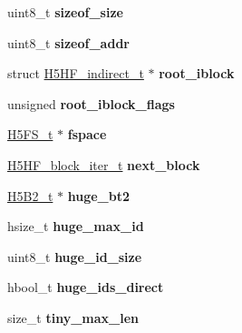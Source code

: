 \begin{DoxyCompactItemize}
uint8\+\_\+t {\bfseries sizeof\+\_\+size}
\item 
\mbox{\label{struct_h5_h_f__hdr__t_a38fe8a107635f6bfbc5d14d339e4a47e}} 
uint8\+\_\+t {\bfseries sizeof\+\_\+addr}
\item 
\mbox{\label{struct_h5_h_f__hdr__t_a09759190ca04fe45961f681103ce82b6}} 
struct \hyperlink{struct_h5_h_f__indirect__t}{H5\+H\+F\+\_\+indirect\+\_\+t} $\ast$ {\bfseries root\+\_\+iblock}
\item 
\mbox{\label{struct_h5_h_f__hdr__t_a3e6bc4aef3da26f6823f104deafa921f}} 
unsigned {\bfseries root\+\_\+iblock\+\_\+flags}
\item 
\mbox{\label{struct_h5_h_f__hdr__t_a1e94a27946dfd6fc386fc44df4c1bcc1}} 
\hyperlink{struct_h5_f_s__t}{H5\+F\+S\+\_\+t} $\ast$ {\bfseries fspace}
\item 
\mbox{\label{struct_h5_h_f__hdr__t_ab66fdd4572188541f4c58ed7dd97bb92}} 
\hyperlink{struct_h5_h_f__block__iter__t}{H5\+H\+F\+\_\+block\+\_\+iter\+\_\+t} {\bfseries next\+\_\+block}
\item 
\mbox{\label{struct_h5_h_f__hdr__t_a4232dfb05d316abd8a4cf77c0620cf7a}} 
\hyperlink{struct_h5_b2__t}{H5\+B2\+\_\+t} $\ast$ {\bfseries huge\+\_\+bt2}
\item 
\mbox{\label{struct_h5_h_f__hdr__t_a0465cfd5da4c7e3499e6f8b440ad60b5}} 
hsize\+\_\+t {\bfseries huge\+\_\+max\+\_\+id}
\item 
\mbox{\label{struct_h5_h_f__hdr__t_a49650be37ed599b972c0a05b41628613}} 
uint8\+\_\+t {\bfseries huge\+\_\+id\+\_\+size}
\item 
\mbox{\label{struct_h5_h_f__hdr__t_a769e4b91bc1d71b8cba229b5ed7c24ac}} 
hbool\+\_\+t {\bfseries huge\+\_\+ids\+\_\+direct}
\item 
\mbox{\label{struct_h5_h_f__hdr__t_a8443c797ccd82dfc2b5765e0fd863917}} 
size\+\_\+t {\bfseries tiny\+\_\+max\+\_\+len}
\item 

\end{DoxyCompactItemize}
